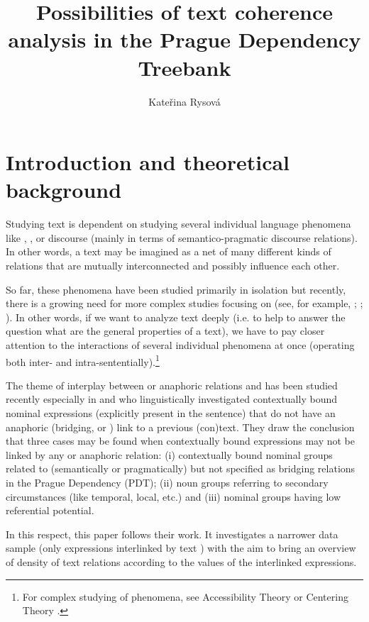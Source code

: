 \documentclass[output=paper]{langsci/langscibook.cls}
\title{Possibilities of text coherence analysis in the Prague Dependency Treebank}
\author{Kateřina Rysová \affiliation{Charles University, Faculty of Mathematics and Physics}}
\begin{document}
\section{Introduction and theoretical background\label{rysova_k:sec:Introduction}}

Studying text  is dependent on studying several individual language phenomena like , ,  or discourse (mainly in terms of semantico-pragmatic discourse relations). In other words, a text may be imagined as a net of many different kinds of relations that are mutually interconnected and possibly influence each other. 

So far, these phenomena have been studied primarily in isolation but recently, there is a growing need for more complex studies focusing on  (see, for example, \citealt{Hajicova2006, Hajicova2011}; \citealt{Eckert2010}; \citealt{Rysova2015Analyzing}). In other words, if we want to analyze text  deeply (i.e. to help to answer the question what are the general properties of a text), we have to pay closer attention to the interactions of several individual phenomena at once (operating both inter- and intra-sententially).\footnote{For complex studying of  phenomena, see Accessibility Theory \citep{ariel1988referring} or Centering Theory \citep{joshi1981control, grosz1986attention}.}  

The theme of interplay between  or anaphoric relations and  has been studied recently especially in \citet{NedoluzhkoHajicova2015} and \citet{Nedoluzhko2015} who linguistically investigated contextually bound nominal expressions (explicitly present in the sentence) that do not have an anaphoric (bridging,  or ) link to a previous (con)text. They draw the conclusion that three cases may be found when contextually bound expressions may not be linked by any  or anaphoric relation: (i) contextually bound nominal groups related to  (semantically or pragmatically) but not specified as bridging relations in the Prague Dependency  (PDT); (ii) noun groups referring to secondary circumstances (like temporal, local, etc.) and (iii) nominal groups having low referential potential.

In this respect, this paper follows their work. It investigates a narrower data sample (only expressions interlinked by text ) with the aim to bring an overview of density of text  relations according to the  values of the interlinked expressions.
\end{document}

